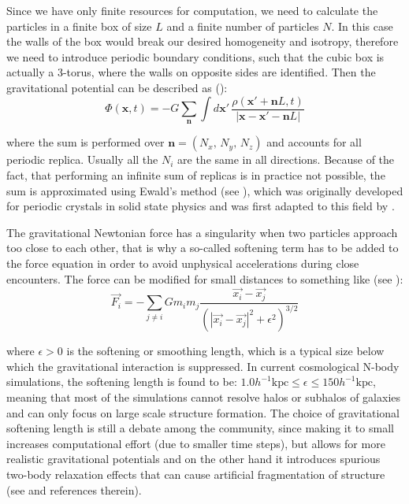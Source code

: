 Since we have only finite resources for computation, we need to calculate
the particles in a finite box of size $L$ and a finite number of
particles $N$. In this case the walls of the box would break our
desired homogeneity and isotropy, therefore we need to introduce periodic
boundary conditions, such that the cubic box is actually a 3-torus,
where the walls on opposite sides are identified. Then the gravitational
potential can be described as (\citet{dehnen_n-body_2011}): 
\begin{equation}
\Phi(\mathbf{x},t)=-G\sum_{\mathbf{n}}\int d\mathbf{x}'\,\frac{\rho(\mathbf{x}'+\mathbf{n}L,t)}{\left|\mathbf{x-x}'-\mathbf{n}L\right|}
\end{equation}


where the sum is performed over $\mathbf{n}=(N_{x},\,N_{y},\,N_{z})$
and accounts for all periodic replica. Usually all the $N_{i}$ are
the same in all directions. Because of the fact, that performing an
infinite sum of replicas is in practice not possible, the sum is approximated
using Ewald's method (see \citet{ewald_berechnung_1921}), which was
originally developed for periodic crystals in solid state physics
and was first adapted to this field by \citet{hernquist_application_1991}.

The gravitational Newtonian force has a singularity when two particles
approach too close to each other, that is why a so-called softening
term has to be added to the force equation in order to avoid unphysical
accelerations during close encounters. The force can be modified for
small distances to something like (see \citet{trenti_gravitational_2008}):
\begin{equation}
\vec{F_{i}}=-\sum_{j\neq i}Gm_{i}m_{j}\frac{\vec{x_{i}}-\vec{x_{j}}}{\left(\left|\vec{x_{i}}-\vec{x_{j}}\right|^{2}+\epsilon^{2}\right)^{3/2}}
\end{equation}


where $\epsilon>0$ is the softening or smoothing length, which is
a typical size below which the gravitational interaction is suppressed.
In current cosmological N-body simulations, the softening length is
found to be: $1.0h^{-1}\mbox{kpc}\leq\epsilon\leq150h^{-1}\mbox{kpc}$,
meaning that most of the simulations cannot resolve halos or subhalos
of galaxies and can only focus on large scale structure formation.
The choice of gravitational softening length is still a debate among
the community, since making it to small increases computational effort
(due to smaller time steps), but allows for more realistic gravitational
potentials and on the other hand it introduces spurious two-body relaxation
effects that can cause artificial fragmentation of structure (see
\citet{kuhlen_numerical_2012} and references therein).

